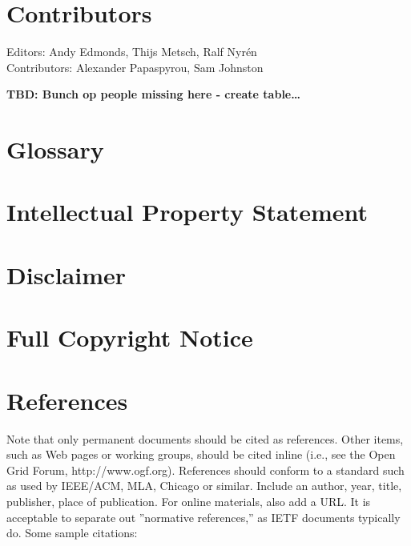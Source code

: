 \documentclass[10pt,a4paper,british]{article}
\begin{document}
\section{Contributors}
Editors: Andy Edmonds, Thijs Metsch, Ralf Nyrén \\
Contributors: Alexander Papaspyrou, Sam Johnston

\textbf{TBD: Bunch op people missing here - create table\ldots}

\section{Glossary}
\label{sec:glossary}



\section{Intellectual Property Statement}


\section{Disclaimer}


\section{Full Copyright Notice}


\section{References}

Note that only permanent documents should be cited as
references. Other items, such as Web pages or working groups, should
be cited inline (i.e., see the Open Grid Forum,
http://www.ogf.org). References should conform to a standard such as
used by IEEE/ACM, MLA, Chicago or similar. Include an author, year,
title, publisher, place of publication. For online materials, also add
a URL. It is acceptable to separate out ''normative references,'' as
IETF documents typically do. Some sample citations:
\end{document}
